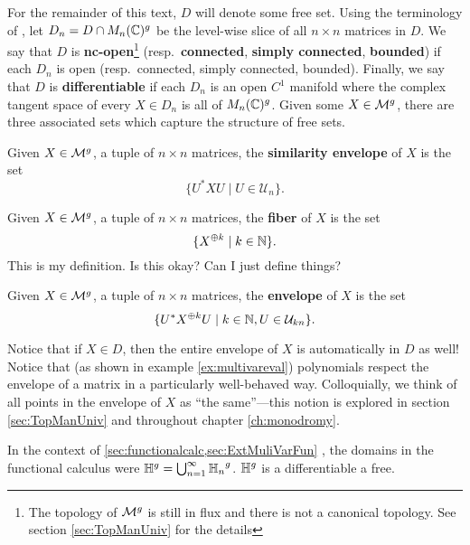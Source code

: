 For the remainder of this text, \(D\) will denote some free set. Using the
terminology of \cite{pascoeFreeNoncommutativePrincipal2020}, let
\(D_n = D \cap M_n(\mathbb{C})^g\) be the level-wise slice of all \(n \times n\)
matrices in \(D\). We say that \(D\) is \textbf{nc-open}\footnote{The topology of \(\mathcal{M}^g\)
  is still in flux and there is not a canonical topology. See section \ref{sec:TopManUniv} for
  the details } (resp.\ \textbf{connected}, \textbf{simply connected}, \textbf{bounded}) if each \(D_n\) is open
(resp.\ connected, simply connected, bounded). Finally, we say that \(D\) is
\textbf{differentiable} if each \(D_n\) is an open \(C^1\) manifold where the
complex tangent space of every \(X \in D_n\) is all of \(M_n(\mathbb{C})^g\).
Given some \(X \in \mathcal{M}^{g} \), there are three associated sets which capture the
structure of free sets.

\begin{definition}
  \label{def:semenv}
  Given \(X \in \mathcal{M}^{g} \), a tuple of \(n \times n\) matrices, the
  \textbf{similarity envelope} of \(X\) is the set
  \[
    \{U^* X U \mid  U \in \mathcal{U}_n\}.
  \]
\end{definition}

\begin{definition}[Fiber]
  \label{def:fiber}
  Given \(X \in \mathcal{M}^{g} \), a tuple of \(n \times n\) matrices, the
  \textbf{fiber} of \(X\) is the set
  \[
    \{X^{\oplus k} \mid  k \in \mathbb{N} \}.
  \]
  {\color{red} This is my definition. Is this okay? Can I just define things?}
\end{definition}

\begin{definition}[Envelope]
  \label{def:env}
  Given \(X \in \mathcal{M}^{g} \), a tuple of \(n \times n\) matrices, the
  \textbf{envelope} of \(X\) is the set
  \[
    \{ U^* X^{\oplus k} U \mid k \in \mathbb{N}, U \in \mathcal{U}_{kn} \}.
  \]
\end{definition}
Notice that if \(X \in D\), then the entire envelope of \(X\) is automatically
in \(D\) as well! Notice that (as shown in example \ref{ex:multivareval})
polynomials respect the envelope of a matrix in a particularly well-behaved way.
Colloquially, we think of all points in the envelope of \(X\) as ``the
same''---this notion is explored in section \ref{sec:TopManUniv} and throughout
chapter \ref{ch:monodromy}.

In the context of \cref{sec:functionalcalc,sec:ExtMuliVarFun}
%
, the domains in the functional calculus were
\(\mathbb{H}^g = \bigcup_{n=1}^{\infty} {\mathbb{H}_n}^g\). \(\mathbb{H} ^g\) is a differentiable a
free.

